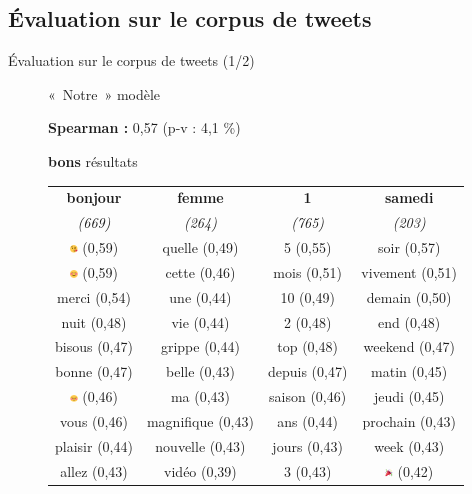 \documentclass[10pt,xcolor=table,color={dvipsnames,usenames},ignorenonframetext,usepdftitle=false,french]{beamer}
\begin{document}
\hypertarget{uxe9valuation-sur-le-corpus-de-tweets}{%
\subsection{Évaluation sur le corpus de
tweets}\label{uxe9valuation-sur-le-corpus-de-tweets}}

\begin{frame}{Évaluation sur le corpus de tweets (1/2)}
\protect\hypertarget{uxe9valuation-sur-le-corpus-de-tweets-12}{}

\begin{figure}
\begin{minipage}{.4\textwidth}


« Notre » modèle

\medskip

\footnotesize
\textbf{ Spearman : } 0,57 (p-v : 4,1 \%)
\normalsize

\medskip

\faArrowCircleRight{} \textbf{bons} résultats


\end{minipage}%
\begin{minipage}{.6\textwidth}
\tiny

\begin{table}[!h]
\begin{center}
\begin{tabular}{|c|c|c|c|}
    \hline
\textbf{bonjour} & \textbf{femme} & \textbf{1} & \textbf{samedi} \tabularnewline
\emph{(669)} & \emph{(264)} & \emph{(765)} & \emph{(203)} \tabularnewline
       \hline
\includegraphics[height=2mm]{img/emojis/1.png} (0,59) & quelle (0,49) & 5 (0,55) & soir (0,57) \tabularnewline
\includegraphics[height=2mm]{img/emojis/2.png} (0,59) & cette (0,46) & mois (0,51) & vivement (0,51) \tabularnewline
merci (0,54) & une (0,44) & 10 (0,49) & demain (0,50) \tabularnewline
nuit (0,48) & vie (0,44) & 2 (0,48) & end (0,48) \tabularnewline
bisous (0,47) & grippe (0,44) & top (0,48) & weekend (0,47) \tabularnewline
bonne (0,47) & belle (0,43) & depuis (0,47) & matin (0,45) \tabularnewline
\includegraphics[height=2mm]{img/emojis/3.png} (0,46) & ma (0,43) & saison (0,46) & jeudi (0,45) \tabularnewline
vous (0,46) & magnifique (0,43) & ans (0,44) & prochain (0,43) \tabularnewline
plaisir (0,44) & nouvelle (0,43) & jours (0,43) & week (0,43) \tabularnewline
allez (0,43) & vidéo (0,39) & 3 (0,43) & \includegraphics[height=2mm]{img/emojis/4.png} (0,42) \tabularnewline
    \hline
 \end{tabular}
\captionsetup{margin=0cm,format=hang,justification=justified}


\end{center}
\end{table}
\end{minipage}
\end{figure}
\end{frame}
\end{document}

